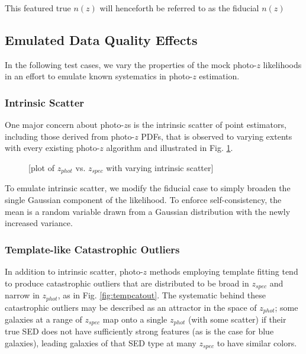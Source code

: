 \documentclass[iop]{emulateapj}
\begin{document}
This featured true $n(z)$ will henceforth be referred to as the fiducial $n(z)$

\subsection{Emulated Data Quality Effects}
\label{sec:likelihoods}

In the following test cases, we vary the properties of the mock photo-$z$ 
likelihoods in an effort to emulate known systematics in photo-$z$ estimation.

\subsubsection{Intrinsic Scatter}
\label{sec:intscat}

One major concern about photo-$z$s is the intrinsic scatter of point 
estimators, including those derived from photo-$z$ PDFs, that is observed to 
varying extents with every existing photo-$z$ algorithm and illustrated in Fig. 
\ref{fig:intscat}.  

\begin{figure}
	\begin{center}
		\caption{[plot of $z_{phot}$ vs. $z_{spec}$ with varying 
intrinsic scatter]}
		\label{fig:intscat}
	\end{center}
\end{figure}

To emulate intrinsic scatter, we modify the fiducial case to simply broaden the 
single Gaussian component of the likelihood.  To enforce self-consistency, the 
mean is a random variable drawn from a Gaussian distribution with the newly 
increased variance.

\subsubsection{Template-like Catastrophic Outliers}
\label{sec:tempcatout}

In addition to intrinsic scatter, photo-$z$ methods employing template fitting 
tend to produce catastrophic outliers that are distributed to be broad in 
$z_{spec}$ and narrow in $z_{phot}$, as in Fig. \ref{fig:tempcatout}.  The 
systematic behind these catastrophic outliers may be described as an attractor 
in the space of $z_{phot}$; some galaxies at a range of $z_{spec}$ map onto a 
single $z_{phot}$ (with some scatter) if their true SED does not have 
sufficiently strong features (as is the case for blue galaxies), leading 
galaxies of that SED type at many $z_{spec}$ to have similar colors.
\end{document}
